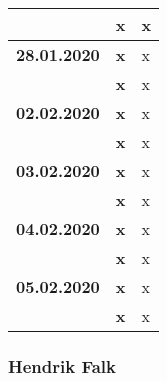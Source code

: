 {\begin{longtable}{|l|l|p{11cm}|}
			& \textbf{\hfill x} & x
		\\ \hline \textbf{28.01.2020}
			& \textbf{\hfill x} & x \\\cline{2-3}
			& \textbf{\hfill x} & x
		\\ \hline \textbf{02.02.2020}
			& \textbf{\hfill x} & x \\\cline{2-3}
			& \textbf{\hfill x} & x
		\\ \hline \textbf{03.02.2020}
			& \textbf{\hfill x} & x \\\cline{2-3}
			& \textbf{\hfill x} & x
		\\ \hline \textbf{04.02.2020}
			& \textbf{\hfill x} & x \\\cline{2-3}
			& \textbf{\hfill x} & x
		\\ \hline \textbf{05.02.2020}
			& \textbf{\hfill x} & x \\\cline{2-3}
			& \textbf{\hfill x} & x	\\
		\hline\hline
	\end{longtable}
}

\clearpage

\subsubsection{Hendrik Falk}

